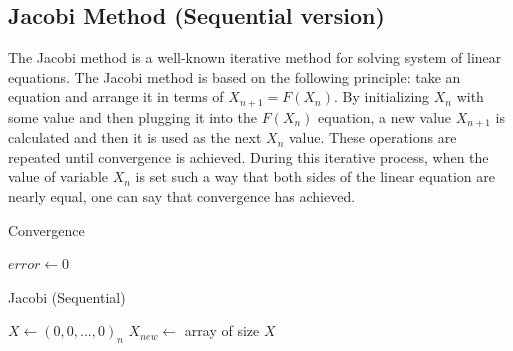 \documentclass[11pt]{article}       %
\begin{document}
\subsection{Jacobi Method (Sequential version)}

The Jacobi method is a well-known iterative method for solving system of linear equations\cite{2013handbook}. The Jacobi method is based on the following principle: take an equation and arrange it in terms of $X_{n+1} = F(X_n)$. By initializing $X_n$ with some value and then plugging it into the $F(X_n)$ equation, a new value $X_{n+1}$ is calculated and then it is used as the next $X_n$ value. These operations are repeated until convergence is achieved. During this iterative process, when the value of variable $X_n$ is set such a way that both sides of the linear equation are nearly equal, one can say that convergence has achieved.

\begin{algorithm}
\DontPrintSemicolon
\caption{Convergence}\label{alg:convergence}
$error \gets 0$\;
\end{algorithm}


\begin{algorithm}
\DontPrintSemicolon 
\caption{Jacobi (Sequential)}\label{alg:jacobi_seq}
$X \gets (0,0,...,0)_n$\;
 $X_{new} \gets $ array of size $X$\;
\end{algorithm}
\end{document}
